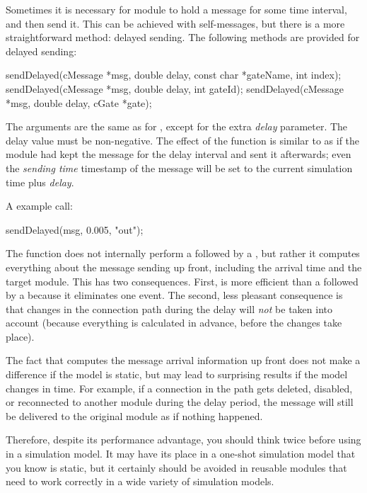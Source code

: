 \begin{ned}
Sometimes it is necessary for module to hold a message for some time interval,
and then send it. This can be achieved with self-messages, but there is a
more straightforward method: delayed sending. The
following methods are provided for delayed sending:

\begin{cpp}
sendDelayed(cMessage *msg, double delay, const char *gateName, int index);
sendDelayed(cMessage *msg, double delay, int gateId);
sendDelayed(cMessage *msg, double delay, cGate *gate);
\end{cpp}

The arguments are the same as for , except for the extra
\textit{delay} parameter. The delay value must be non-negative.
The effect of the function is similar to as if the module
had kept the message for the delay interval and sent it afterwards;
even the \textit{sending time} timestamp of the message will be set to
the current simulation time plus \textit{delay}.

A example call:

\begin{cpp}
sendDelayed(msg, 0.005, "out");
\end{cpp}

The  function does not internally perform a
 followed by a , but rather it computes
everything about the message sending up front, including the arrival time
and the target module. This has two consequences. First,
 is more efficient than a 
followed by a  because it eliminates one event. The second, less
pleasant consequence is that changes in the connection path during the
delay will \textit{not} be taken into account (because everything is
calculated in advance, before the changes take place).

\begin{note}
  The fact that  computes the message arrival
  information up front does not make a difference if the model is static,
  but may lead to surprising results if the model changes in time.
  For example, if a connection in the path gets deleted, disabled, or
  reconnected to another module during the delay period, the message
  will still be delivered to the original module as if nothing happened.

  Therefore, despite its performance advantage, you should think twice
  before using  in a simulation model. It may have
  its place in a one-shot simulation model that you know is static,
  but it certainly should be avoided in reusable modules that need to
  work correctly in a wide variety of simulation models.
\end{note}



\end{ned}
